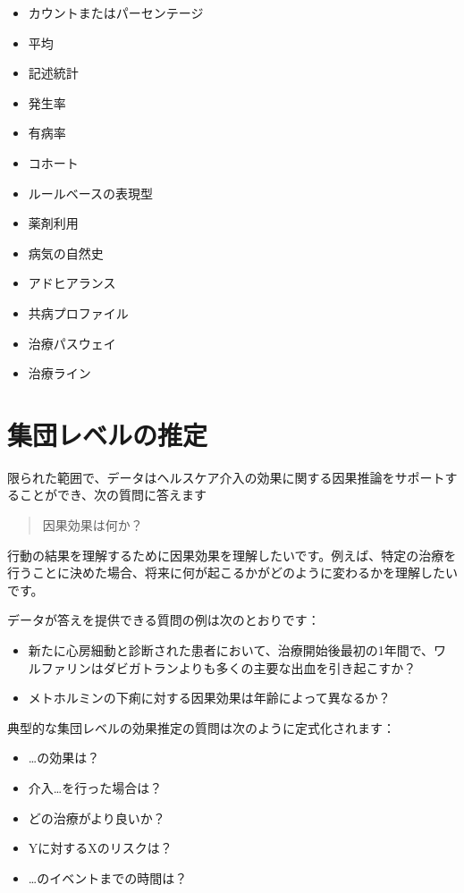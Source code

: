 \documentclass[
  11pt]{book}
\providecommand{\tightlist}{%
  \setlength{\itemsep}{0pt}\setlength{\parskip}{0pt}}
\theoremstyle{definition}
\theoremstyle{definition}
\theoremstyle{definition}
\theoremstyle{definition}
\theoremstyle{remark}
\begin{document}
\begin{itemize}
\tightlist
\item
  カウントまたはパーセンテージ
\item
  平均
\item
  記述統計
\item
  発生率
\item
  有病率
\item
  コホート
\item
  ルールベースの表現型
\item
  薬剤利用
\item
  病気の自然史
\item
  アドヒアランス
\item
  共病プロファイル
\item
  治療パスウェイ
\item
  治療ライン
\end{itemize}

\section{集団レベルの推定}\label{ux96c6ux56e3ux30ecux30d9ux30ebux306eux63a8ux5b9a}


限られた範囲で、データはヘルスケア介入の効果に関する因果推論をサポートすることができ、次の質問に答えます

\begin{quote}
因果効果は何か？
\end{quote}

行動の結果を理解するために因果効果を理解したいです。例えば、特定の治療を行うことに決めた場合、将来に何が起こるかがどのように変わるかを理解したいです。

データが答えを提供できる質問の例は次のとおりです：

\begin{itemize}
\tightlist
\item
  新たに心房細動と診断された患者において、治療開始後最初の1年間で、ワルファリンはダビガトランよりも多くの主要な出血を引き起こすか？
\item
  メトホルミンの下痢に対する因果効果は年齢によって異なるか？
\end{itemize}

典型的な集団レベルの効果推定の質問は次のように定式化されます：

\begin{itemize}
\tightlist
\item
  \ldots の効果は？
\item
  介入\ldots を行った場合は？
\item
  どの治療がより良いか？
\item
  Yに対するXのリスクは？
\item
  \ldots のイベントまでの時間は？
\end{itemize}
\end{document}
